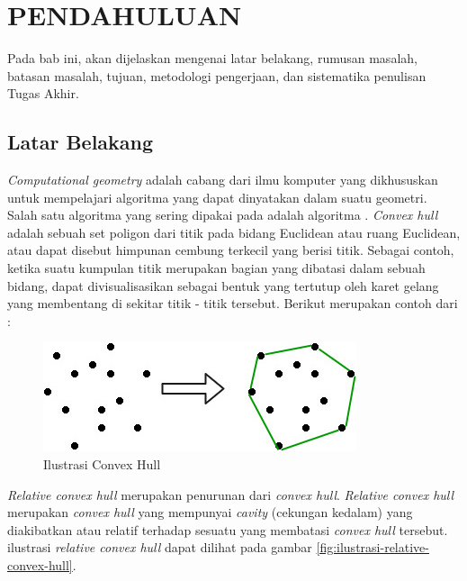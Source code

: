 \vspace{0ex}
\chapter {PENDAHULUAN}

Pada bab ini, akan dijelaskan mengenai latar belakang, rumusan masalah, batasan masalah, tujuan, metodologi pengerjaan, dan sistematika penulisan Tugas Akhir.

\section{Latar Belakang}

\par \textit{Computational geometry} adalah cabang dari ilmu komputer yang dikhususkan untuk mempelajari algoritma yang dapat dinyatakan dalam suatu geometri. Salah satu algoritma yang sering dipakai pada \CG adalah algoritma \CH. \textit{Convex hull} adalah sebuah set poligon dari titik pada bidang Euclidean atau ruang Euclidean, atau dapat disebut himpunan cembung terkecil yang berisi titik. Sebagai contoh, ketika suatu kumpulan titik merupakan bagian yang dibatasi dalam sebuah bidang, \CH dapat divisualisasikan sebagai bentuk yang tertutup oleh karet gelang yang membentang di sekitar titik - titik tersebut. Berikut merupakan contoh dari \CH :
\begin{figure}[!h]
	\Centering
	\includegraphics [width=\textwidth]{bab1/img/ilustrasi-convex-hull}
	\caption {Ilustrasi Convex Hull}
	\label {fig:ilustrasi-convex-hull}
\end{figure}
\par \textit{Relative convex hull} merupakan penurunan dari \textit{convex hull}. \textit{Relative convex hull} merupakan \textit{convex hull} yang mempunyai \textit{cavity} (cekungan kedalam) yang diakibatkan atau relatif terhadap sesuatu yang membatasi \textit{convex hull} tersebut. ilustrasi \textit{relative convex hull} dapat dilihat pada gambar \ref{fig:ilustrasi-relative-convex-hull}.

